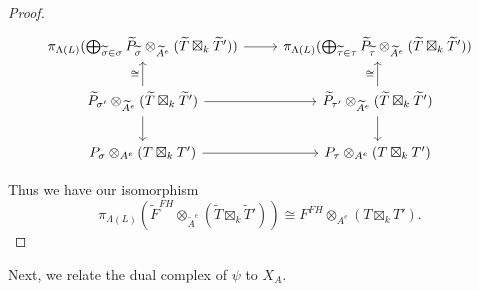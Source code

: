 \documentclass{amsart}
\newcommand{\field}{k}
\theoremstyle{remark}
\begin{document}
\begin{proof}
  \[\begin{tikzcd}
  \pi_{\Lambda(L)}(\bigoplus_{\widetilde{\sigma}\in \sigma} \widetilde{P}_{\widetilde{\sigma}} \otimes_{\widetilde{A}^e} (\widetilde{T}\boxtimes_{\field}\widetilde{T}'))  \arrow[r] & \pi_{\Lambda(L)}(\bigoplus_{\widetilde{\tau}\in \tau} \widetilde{P}_{\widetilde{\tau}} \otimes_{\widetilde{A}^e} (\widetilde{T}\boxtimes_{\field}\widetilde{T}'))\\
  \widetilde{P}_{\sigma'} \otimes_{\widetilde{A}^e} (\widetilde{T}\boxtimes_{\field}\widetilde{T}')  \arrow[r] \arrow[d] \arrow[u,"\cong"] & \widetilde{P}_{\tau'} \otimes_{\widetilde{A}^e} (\widetilde{T}\boxtimes_{\field}\widetilde{T}')\arrow[d] \arrow[u,"\cong"]\\
  P_\sigma \otimes_{A^e} (T\boxtimes_{\field} T') \arrow[r] & P_{\tau} \otimes_{A^e} (T\boxtimes_{\field} T')
  \end{tikzcd}\]

  Thus we have our isomorphism \[\pi_{\Lambda(L)}(\widetilde{F}^{FH}\otimes_{\widetilde{A}^{e}} (\widetilde{T}\boxtimes_{\field} \widetilde{T}')) \cong F^{FH}\otimes_{A^e} (T\boxtimes_{\field} T').\]
\end{proof}

Next, we relate the dual complex of $\psi$ to $X_A$.
\end{document}
